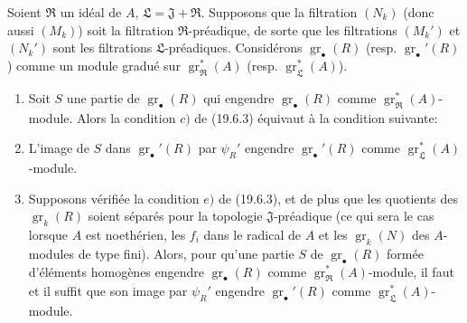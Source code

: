 \begin{corollary}[19.6.4]
\label{IV.19.6.4}
Soient $\mathfrak R$ un idéal de $A$, $\mathfrak L=\mathfrak J+\mathfrak R$. Supposons que la filtration $(N_k)$ (donc aussi $(M_k)$) soit la filtration $\mathfrak R$-préadique, de sorte que les filtrations $(M_k')$ et $(N_k')$ sont les filtrations $\mathfrak L$-préadiques. Considérons $\operatorname{gr}_\bullet(R)$ (resp. $\operatorname{gr}_\bullet'(R)$) comme un module gradué sur $\operatorname{gr}_{\mathfrak R}^*(A)$ (resp. $\operatorname{gr}_{\mathfrak L}^*(A)$).
\begin{enumerate}
  \item[(i)] Soit $S$ une partie de $\operatorname{gr}_\bullet(R)$ qui engendre $\operatorname{gr}_\bullet(R)$ comme $\operatorname{gr}_{\mathfrak R}^*(A)$-module. Alors la condition $c)$ de (19.6.3) équivaut à la condition suivante:
  \item[c$'$)] L'image de $S$ dans $\operatorname{gr}_\bullet'(R)$ par $\psi_R'$ engendre $\operatorname{gr}_\bullet'(R)$ comme $\operatorname{gr}_{\mathfrak L}^*(A)$-module.
  \item[(ii)] Supposons vérifiée la condition $e)$ de (19.6.3), et de plus que les quotients des $\operatorname{gr}_k(R)$ soient séparés pour la topologie $\mathfrak J$-préadique (ce qui sera le cas lorsque $A$ est noethérien, les $f_i$ dans le radical de $A$ et les $\operatorname{gr}_k(N)$ des $A$-modules de type fini). Alors, pour qu'une partie $S$ de $\operatorname{gr}_\bullet(R)$ formée d'éléments homogènes engendre $\operatorname{gr}_\bullet(R)$ comme $\operatorname{gr}_{\mathfrak R}^*(A)$-module, il faut et il suffit que son image par $\psi_R'$ engendre $\operatorname{gr}_\bullet'(R)$ comme $\operatorname{gr}_{\mathfrak L}^*(A)$-module.
\end{enumerate}
\end{corollary}


